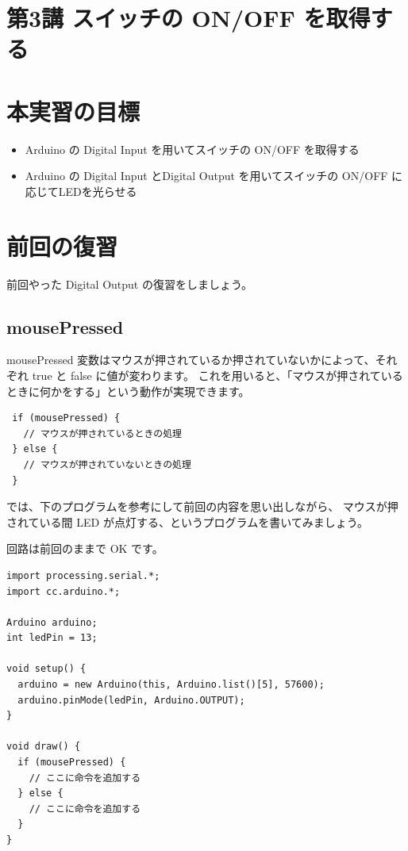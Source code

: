 \documentclass[11pt,a4paper]{jarticle}
\begin{document}
\section*{\LARGE{第3講 スイッチの ON/OFF を取得する}}
\section{本実習の目標}
\begin{itemize}
 \item Arduino の Digital Input を用いてスイッチの ON/OFF を取得する
 \item Arduino の Digital Input とDigital Output を用いてスイッチの ON/OFF に応じてLEDを光らせる
\end{itemize}


\section{前回の復習}
前回やった Digital Output の復習をしましょう。

\subsection*{mousePressed}
mousePressed 変数はマウスが押されているか押されていないかによって、それぞれ true と false に値が変わります。
これを用いると、「マウスが押されているときに何かをする」という動作が実現できます。

\begin{lstlisting}
 if (mousePressed) {
   // マウスが押されているときの処理
 } else {
   // マウスが押されていないときの処理
 }
\end{lstlisting}

では、下のプログラムを参考にして前回の内容を思い出しながら、
マウスが押されている間 LED が点灯する、というプログラムを書いてみましょう。

回路は前回のままで OK です。

\begin{lstlisting}
import processing.serial.*;
import cc.arduino.*;
 
Arduino arduino;
int ledPin = 13;
 
void setup() {
  arduino = new Arduino(this, Arduino.list()[5], 57600);
  arduino.pinMode(ledPin, Arduino.OUTPUT);
}
 
void draw() {
  if (mousePressed) {
    // ここに命令を追加する
  } else {
    // ここに命令を追加する
  }
}
\end{lstlisting}
\end{document}
